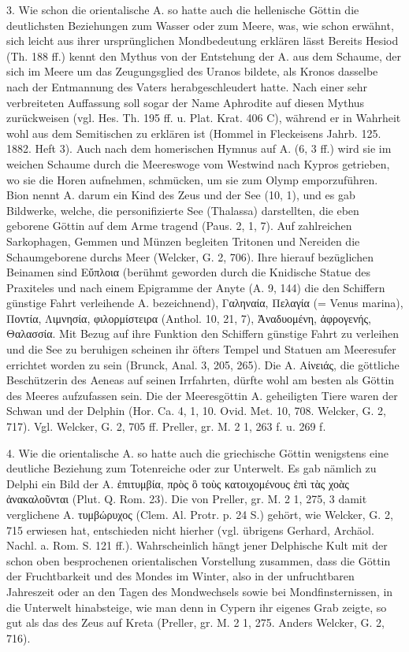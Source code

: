 \documentclass[a4paper, 11pt, oneside]{article}
\begin{document}
3. Wie schon die orientalische A. so hatte auch die hellenische Göttin die deutlichsten Beziehungen zum Wasser oder zum Meere, was, wie schon erwähnt, sich leicht aus ihrer ursprünglichen Mondbedeutung erklären lässt Bereits Hesiod (Th. 188 ff.) kennt den Mythus von der Entstehung der A. aus dem Schaume, der sich im Meere um das Zeugungsglied des Uranos bildete, als Kronos dasselbe nach der Entmannung des Vaters herabgeschleudert hatte. Nach einer sehr verbreiteten Auffassung soll sogar der Name Aphrodite auf diesen Mythus zurückweisen (vgl. Hes. Th. 195 ff. u. Plat. Krat. 406 C), während er in Wahrheit wohl aus dem Semitischen zu erklären ist (Hommel in Fleckeisens Jahrb. 125. 1882. Heft 3). Auch nach dem homerischen Hymnus auf A. (6, 3 ff.) wird sie im weichen Schaume durch die Meereswoge vom Westwind nach Kypros getrieben, wo sie die Horen aufnehmen, schmücken, um sie zum Olymp emporzuführen. Bion nennt A. darum ein Kind des Zeus und der See (10, 1), und es gab Bildwerke, welche, die personifizierte See (Thalassa) darstellten, die eben geborene Göttin auf dem Arme tragend (Paus. 2, 1, 7). Auf zahlreichen Sarkophagen, Gemmen und Münzen begleiten Tritonen und Nereiden die Schaumgeborene durchs Meer (Welcker, G. 2, 706). Ihre hierauf bezüglichen Beinamen sind Εὔπλοια (berühmt geworden durch die Knidische Statue des Praxiteles und nach einem Epigramme der Anyte (A. 9, 144) die den Schiffern günstige Fahrt verleihende A. bezeichnend), Γαληναία, Πελαγία (= Venus marina), Ποντία, Λιμνησία, φιλορμίστειρα (Anthol. 10, 21, 7), Ἀναδυομένη, ἀφρογενής, Θαλασσία. Mit Bezug auf ihre Funktion den Schiffern günstige Fahrt zu verleihen und die See zu beruhigen scheinen ihr öfters Tempel und Statuen am Meeresufer errichtet worden zu sein (Brunck, Anal. 3, 205, 265). Die A. Αἰνειάς, die göttliche Beschützerin des Aeneas auf seinen Irrfahrten, dürfte wohl am besten als Göttin des Meeres aufzufassen sein. Die der Meeresgöttin A. geheiligten Tiere waren der Schwan und der Delphin (Hor. Ca. 4, 1, 10. Ovid. Met. 10, 708. Welcker, G. 2, 717). Vgl. Welcker, G. 2, 705 ff. Preller, gr. M. 2 1, 263 f. u. 269 f.

4. Wie die orientalische A. so hatte auch die griechische Göttin wenigstens eine deutliche Beziehung zum Totenreiche oder zur Unterwelt. Es gab nämlich zu Delphi ein Bild der A. ἐπιτυμβία, πρὸς ὃ τοὺς κατοιχομένους ἐπὶ τὰς χοὰς ἀνακαλοῦνται (Plut. Q. Rom. 23). Die von Preller, gr. M. 2 1, 275, 3 damit verglichene A. τυμβώρυχος (Clem. Al. Protr. p. 24 S.) gehört, wie Welcker, G. 2, 715 erwiesen hat, entschieden nicht hierher (vgl. übrigens Gerhard, Archäol. Nachl. a. Rom. S. 121 ff.). Wahrscheinlich hängt jener Delphische Kult mit der schon oben besprochenen orientalischen Vorstellung zusammen, dass die Göttin der Fruchtbarkeit und des Mondes im Winter, also in der unfruchtbaren Jahreszeit oder an den Tagen des Mondwechsels sowie bei Mondfinsternissen, in die Unterwelt hinabsteige, wie man denn in Cypern ihr eigenes Grab zeigte, so gut als das des Zeus auf Kreta (Preller, gr. M. 2 1, 275. Anders Welcker, G. 2, 716).
\end{document}
